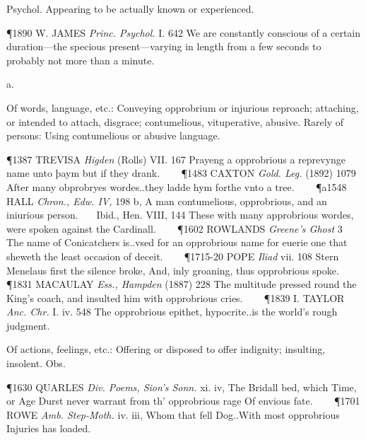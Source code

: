 \begin{description}[wide, labelwidth=!, labelindent=0pt]
\begin{myenumerate}
 Psychol. Appearing to be actually known or experienced.

\P 1890 W. JAMES  \textit{Princ. Psychol.} I. 642 We are constantly conscious of a certain duration—the specious present—varying in length from a few seconds to probably not more than a minute.
\end{myenumerate}

 a.

\noindent {}

\vspace{-0.3cm}

\begin{myenumerate}

 Of words, language, etc.: Conveying opprobrium or injurious reproach; attaching, or intended to attach, disgrace; contumelious, vituperative, abusive. Rarely of persons: Using contumelious or abusive language.

\P 1387 TREVISA  \textit{Higden} (Rolls) VII. 167 Prayeng a opprobrious a reprevynge name unto þaym but if they drank.    
\P 1483 CAXTON  \textit{Gold. Leg.} (1892) 1079 After many obprobryes wordes..they ladde hym forthe vnto a tree.    
\P a1548 HALL  \textit{Chron., Edw. IV,} 198 b, A man contumelious, opprobrious, and an iniurious person.    Ibid., Hen. VIII, 144 These with many approbrious wordes, were spoken against the Cardinall.    
\P 1602 ROWLANDS  \textit{Greene's Ghost} 3 The name of Conicatchers is..vsed for an opprobrious name for euerie one that sheweth the least occasion of deceit.    
\P 1715-20 POPE  \textit{Iliad} vii. 108 Stern Menelaus first the silence broke, And, inly groaning, thus opprobrious spoke.    
\P 1831 MACAULAY  \textit{Ess., Hampden} (1887) 228 The multitude pressed round the King's coach, and insulted him with opprobrious cries.    
\P 1839 I. TAYLOR  \textit{Anc. Chr.} I. iv. 548 The opprobrious epithet, hypocrite..is the world's rough judgment.

 Of actions, feelings, etc.: Offering or disposed to offer indignity; insulting, insolent. Obs.

\P 1630 QUARLES  \textit{Div. Poems, Sion's Sonn.} xi. iv, The Bridall bed, which Time, or Age Durst never warrant from th' opprobrious rage Of envious fate.    
\P 1701 ROWE  \textit{Amb. Step-Moth.} iv. iii, Whom that fell Dog..With most opprobrious Injuries has loaded.


\end{myenumerate}
\end{description}
